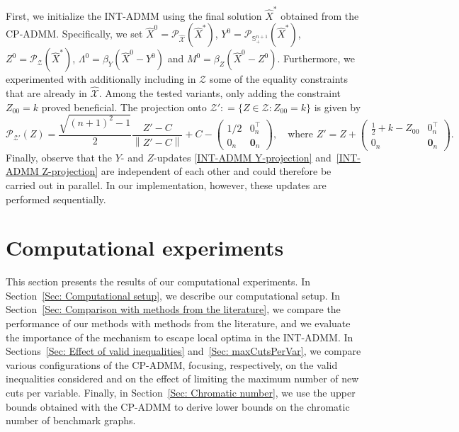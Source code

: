 \documentclass[11pt, a4paper]{article}
\newcommand{\eqdef}{\mathrel{\mathop:}=}
\newcommand\norm[1]{\left\lVert#1\right\rVert}
\newcommand{\mc}{\mathcal}
\newcommand{\aug}[1]{\hat{#1}}
\begin{document}
First, we initialize the INT-ADMM using the final solution $\aug{X}^*$ obtained from the CP-ADMM. 
Specifically, we set $\aug{X}^0 = \mc{P}_{\aug{\mc{X}}}(\aug{X}^*)$, $Y^0 = \mc{P}_{\mathbb{S}^{n+1}_+}(\aug{X}^*)$, $Z^0 = \mc{P}_{\mc{Z}}(\aug{X}^*)$, $\Lambda^0 = \beta_Y(\aug{X}^0 - Y^0)$ and $M^0 = \beta_Z(\aug{X}^0 - Z^0)$.
Furthermore, we experimented with additionally including in $\mc{Z}$ some of the equality constraints that are already in $\aug{\mc{X}}$.
Among the tested variants, only adding the constraint $Z_{00} = k$ proved beneficial.
The projection onto $\mc{Z}' \eqdef \{Z \in \mc{Z}: Z_{00} = k\}$ is given by 
\begin{equation}
    \mc{P}_{\mc{Z}'}(Z) = \frac{\sqrt{(n+1)^2-1}}{2} \frac{Z'-C}{\norm{Z'-C}} + C - \begin{pmatrix} 1/2 & 0_n^\top \\ 0_n & \textbf{0}_n \end{pmatrix}, \quad\text{where } Z' = Z + \begin{pmatrix} \frac{1}{2} + k -Z_{00} & 0_n^\top \\ 0_n & \textbf{0}_n \end{pmatrix}.
\end{equation}
Finally, observe that the $Y$- and $Z$-updates \eqref{INT-ADMM Y-projection} and~\eqref{INT-ADMM Z-projection} are independent of each other and could therefore be carried out in parallel. 
In our implementation, however, these updates are performed sequentially.

\section{Computational experiments} \label{Sec: Computational experiments}
This section presents the results of our computational experiments.
In Section~\ref{Sec: Computational setup}, we describe our computational setup.
In Section~\ref{Sec: Comparison with methods from the literature}, we compare the performance of our methods with methods from the literature, and we evaluate the importance of the mechanism to escape local optima in the INT-ADMM.
In Sections~\ref{Sec: Effect of valid inequalities} and~\ref{Sec: maxCutsPerVar}, we compare various configurations of the CP-ADMM, focusing, respectively, on the valid inequalities considered and on the effect of limiting the maximum number of new cuts per variable.
Finally, in Section~\ref{Sec: Chromatic number}, we use the upper bounds obtained with the CP-ADMM to derive lower bounds on the chromatic number of benchmark graphs.
\end{document}
